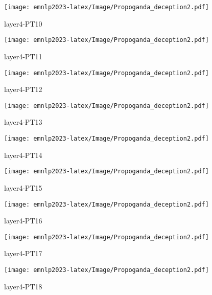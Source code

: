 \begin{figure*}[htbp]
    \begin{subfigure}[b]{0.33\textwidth}
    \centering
        \texttt{[image: emnlp2023-latex/Image/Propoganda\_deception2.pdf]}
        \caption{layer4-PT10}
    \end{subfigure}
    \begin{subfigure}[b]{0.33\textwidth}
    \centering
        \texttt{[image: emnlp2023-latex/Image/Propoganda\_deception2.pdf]}
        \caption{layer4-PT11}
    \end{subfigure}    
    \begin{subfigure}[b]{0.33\textwidth}
    \centering
        \texttt{[image: emnlp2023-latex/Image/Propoganda\_deception2.pdf]}
        \caption{layer4-PT12}
    \end{subfigure}
    \begin{subfigure}[b]{0.33\textwidth}
    \centering
        \texttt{[image: emnlp2023-latex/Image/Propoganda\_deception2.pdf]}
        \caption{layer4-PT13}
    \end{subfigure}
    \begin{subfigure}[b]{0.33\textwidth}
    \centering
        \texttt{[image: emnlp2023-latex/Image/Propoganda\_deception2.pdf]}
        \caption{layer4-PT14}
    \end{subfigure}
    \begin{subfigure}[b]{0.33\textwidth}
    \centering
        \texttt{[image: emnlp2023-latex/Image/Propoganda\_deception2.pdf]}
        \caption{layer4-PT15}
    \end{subfigure}
    \begin{subfigure}[b]{0.33\textwidth}
    \centering
        \texttt{[image: emnlp2023-latex/Image/Propoganda\_deception2.pdf]}
        \caption{layer4-PT16}
    \end{subfigure}
    \begin{subfigure}[b]{0.33\textwidth}
    \centering
        \texttt{[image: emnlp2023-latex/Image/Propoganda\_deception2.pdf]}
        \caption{layer4-PT17}
    \end{subfigure}
    \begin{subfigure}[b]{0.33\textwidth}
    \centering
        \texttt{[image: emnlp2023-latex/Image/Propoganda\_deception2.pdf]}
        \caption{layer4-PT18}
    \end{subfigure}
\end{figure*}